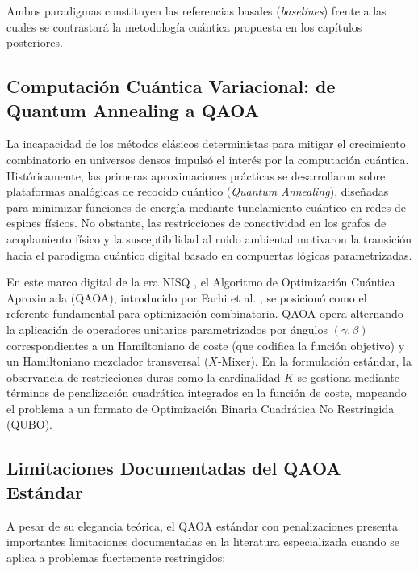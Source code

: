 Ambos paradigmas constituyen las referencias basales (\textit{baselines}) frente a las cuales se contrastará la metodología cuántica propuesta en los capítulos posteriores.

\subsection{Computación Cuántica Variacional: de Quantum Annealing a QAOA}
\label{subsec:qaoa_evolucion}

La incapacidad de los métodos clásicos deterministas para mitigar el crecimiento combinatorio en universos densos impulsó el interés por la computación cuántica. Históricamente, las primeras aproximaciones prácticas se desarrollaron sobre plataformas analógicas de recocido cuántico (\textit{Quantum Annealing}), diseñadas para minimizar funciones de energía mediante tunelamiento cuántico en redes de espines físicos. No obstante, las restricciones de conectividad en los grafos de acoplamiento físico y la susceptibilidad al ruido ambiental motivaron la transición hacia el paradigma cuántico digital basado en compuertas lógicas parametrizadas.

En este marco digital de la era NISQ \cite{Preskill2018}, el Algoritmo de Optimización Cuántica Aproximada (QAOA), introducido por Farhi et al. \cite{Farhi2014}, se posicionó como el referente fundamental para optimización combinatoria. QAOA opera alternando la aplicación de operadores unitarios parametrizados por ángulos $(\gamma, \beta)$ correspondientes a un Hamiltoniano de coste (que codifica la función objetivo) y un Hamiltoniano mezclador transversal ($X$-Mixer). En la formulación estándar, la observancia de restricciones duras como la cardinalidad $K$ se gestiona mediante términos de penalización cuadrática integrados en la función de coste, mapeando el problema a un formato de Optimización Binaria Cuadrática No Restringida (QUBO).

\subsection{Limitaciones Documentadas del QAOA Estándar}
\label{subsec:limitaciones_qaoa}

A pesar de su elegancia teórica, el QAOA estándar con penalizaciones presenta importantes limitaciones documentadas en la literatura especializada cuando se aplica a problemas fuertemente restringidos:

